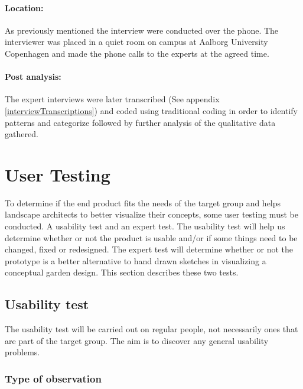 \paragraph*{Location:}
As previously mentioned the interview were conducted over the phone. The interviewer was placed in a quiet room on campus at Aalborg University Copenhagen and made the phone calls to the experts at the agreed time.

\paragraph*{Post analysis:}The expert interviews were later transcribed (See appendix \ref{interviewTranscriptions}) and coded using traditional coding in order to identify patterns and categorize followed by further analysis of the qualitative data gathered.

\section{User Testing}
To determine if the end product fits the needs of the target group and helps landscape architects to better visualize their concepts, some user testing must be conducted. A usability test and an expert test. The usability test will help us determine whether or not the product is usable and/or if some things need to be changed, fixed or redesigned. The expert test will determine whether or not the prototype is a better alternative to hand drawn sketches in visualizing a conceptual garden design. This section describes these two tests.

\subsection{Usability test}

The usability test will be carried out on regular people, not necessarily ones that are part of the target group. The aim is to discover any general usability problems. 

\subsubsection{Type of observation}

